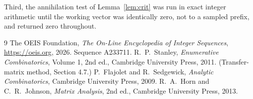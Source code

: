 \documentclass[11pt,a4paper]{article}
\theoremstyle{plain}
\theoremstyle{definition}
\begin{document}
Third, the annihilation test of Lemma~\ref{lem:crit} was run in exact integer arithmetic
until the working vector was identically zero, not to a sampled prefix, and returned zero
throughout.

\begin{thebibliography}{9}
 The OEIS Foundation, \emph{The On-Line Encyclopedia of Integer
Sequences}, \url{https://oeis.org}, 2026. Sequence A233711.
 R.~P.~Stanley, \emph{Enumerative Combinatorics}, Volume 1, 2nd ed.,
Cambridge University Press, 2011. (Transfer-matrix method, Section 4.7.)
 P.~Flajolet and R.~Sedgewick, \emph{Analytic Combinatorics}, Cambridge
University Press, 2009.
 R.~A.~Horn and C.~R.~Johnson, \emph{Matrix Analysis}, 2nd ed., Cambridge
University Press, 2013.
\end{thebibliography}
\end{document}
